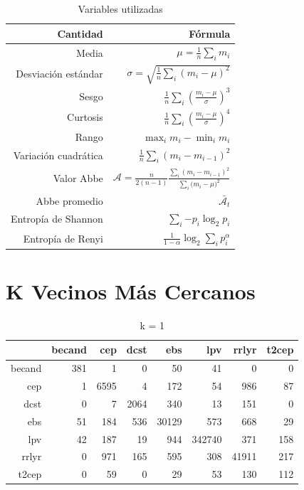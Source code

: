 \documentclass[letterpaper,12pt]{book}
\begin{document}
\begin{table}[ht]
    \centering
   \caption{Variables utilizadas}
    \begin{tabular}{rr}
      \hline
      Cantidad & Fórmula  \\
      \hline
        Media& $\mu =\frac{1}{n}\sum_{i} m_{i}$ \\ 
        Desviación estándar& $\sigma = \sqrt{\frac{1}{n}\sum_{i} (m_{i}-\mu)^{2}}$ \\
        Sesgo & $\frac{1}{n}\sum_{i}{\left(\frac{m_{i}-\mu}{\sigma}\right)^{3}}$ \\
        Curtosis& $\frac{1}{n}\sum_{i}{\left(\frac{m_{i}-\mu}{\sigma}\right)^{4}}$ \\
        Rango& $\max_{i}m_{i} - \min_{i}m_{i}$ \\
        Variación cuadrática& $\frac{1}{n}\sum_{i}(m_{i}-m_{i-1})^{2}$ \\
        Valor Abbe \cite{mowlavi_searching_2014}& $\mathcal{A}=\frac{n}{2(n-1)}\frac{\sum_{i}{(m_{i}-m_{i-1})^{2}}}{\sum_{i}{(m_{i}-\mu})^2}$ \\
        Abbe promedio \cite{mowlavi_searching_2014}& $\bar{\mathcal{A}_{t}}$ \\
        Entropía de Shannon \cite{shannon_mathematical_1948} & $\sum_{i}{-p_{i}\log_{2}{p_{i}}}$ \\
        Entropía de Renyi \cite{renyi_measures_1961}& $\frac{1}{1-\alpha}\log_{2}{\sum_{i}p_{i}^{\alpha}}$\\
      \hline
    \end{tabular}
  \end{table}

\section{K Vecinos Más Cercanos}
\begin{table}[ht]
\centering
\caption{k = 1} 
\label{table:cmknn}
\begin{tabular}{rrrrrrrr}
  \hline
 & becand & cep & dcst & ebs & lpv & rrlyr & t2cep \\ 
  \hline
becand & 381 &   1 &   0 &  50 &  41 &   0 &   0 \\ 
  cep &   1 & 6595 &   4 & 172 &  54 & 986 &  87 \\ 
  dcst &   0 &   7 & 2064 & 340 &  13 & 151 &   0 \\ 
  ebs &  51 & 184 & 536 & 30129 & 573 & 668 &  29 \\ 
  lpv &  42 & 187 &  19 & 944 & 342740 & 371 & 158 \\ 
  rrlyr &   0 & 971 & 165 & 595 & 308 & 41911 & 217 \\ 
  t2cep &   0 &  59 &   0 &  29 &  53 & 130 & 112 \\ 
   \hline
\end{tabular}
\end{table}
\end{document}
